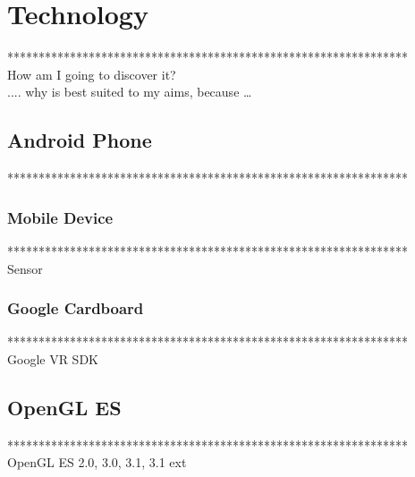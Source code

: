 \label{chapter-technology}
\chapter{Technology}

****************************************************************\\%
How am I going to discover it?\\
.... why is best suited to my aims, because …\\

\section{Android Phone}

****************************************************************\\%

\subsection{Mobile Device}

****************************************************************\\%
Sensor\\

\subsection{Google Cardboard}

****************************************************************\\%
Google VR SDK\\

\section{OpenGL ES}

****************************************************************\\%
OpenGL ES 2.0, 3.0,  3.1, 3.1 ext\\

